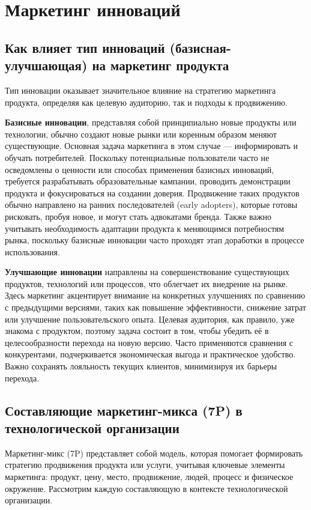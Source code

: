 \section{Маркетинг инноваций}

\subsection{Как влияет тип инноваций (базисная-улучшающая) на маркетинг продукта}

Тип инновации оказывает значительное влияние на стратегию маркетинга продукта, определяя как целевую аудиторию, так и подходы к продвижению. 

\textbf{Базисные инновации}, представляя собой принципиально новые продукты или технологии, обычно создают новые рынки или коренным образом меняют существующие. Основная задача маркетинга в этом случае --- информировать и обучать потребителей. Поскольку потенциальные пользователи часто не осведомлены о ценности или способах применения базисных инноваций, требуется разрабатывать образовательные кампании, проводить демонстрации продукта и фокусироваться на создании доверия. Продвижение таких продуктов обычно направлено на ранних последователей (early adopters), которые готовы рисковать, пробуя новое, и могут стать адвокатами бренда. Также важно учитывать необходимость адаптации продукта к меняющимся потребностям рынка, поскольку базисные инновации часто проходят этап доработки в процессе использования.

\textbf{Улучшающие инновации} направлены на совершенствование существующих продуктов, технологий или процессов, что облегчает их внедрение на рынке. Здесь маркетинг акцентирует внимание на конкретных улучшениях по сравнению с предыдущими версиями, таких как повышение эффективности, снижение затрат или улучшение пользовательского опыта. Целевая аудитория, как правило, уже знакома с продуктом, поэтому задача состоит в том, чтобы убедить её в целесообразности перехода на новую версию. Часто применяются сравнения с конкурентами, подчеркивается экономическая выгода и практическое удобство. Важно сохранять лояльность текущих клиентов, минимизируя их барьеры перехода.


\pagebreak

\subsection{Составляющие маркетинг-микса (7P) в технологической организации}

Маркетинг-микс (7P) представляет собой модель, которая помогает формировать стратегию продвижения продукта или услуги, учитывая ключевые элементы маркетинга: продукт, цену, место, продвижение, людей, процесс и физическое окружение. Рассмотрим каждую составляющую в контексте технологической организации.


